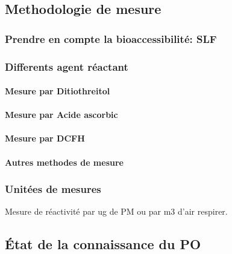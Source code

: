 \subsection{Methodologie de mesure}%
\label{sub:methodologie_de_mesure}

\subsubsection{Prendre en compte la bioaccessibilité: SLF}%
\label{sub:prendre_en_compte_la_bioaccessibilite_slf}

\subsubsection{Differents agent réactant}%
\label{ssub:differents_agent_reactant}

\paragraph{Mesure par Ditiothreitol}%
\label{ssub:mesure_par_ditiothreitol}

\paragraph{Mesure par Acide ascorbic}%
\label{ssub:mesure_par_acide_ascorbic}

\paragraph{Mesure par DCFH}%
\label{ssub:mesure_par_dcfh}

\paragraph{Autres methodes de mesure}%
\label{sub:autres_methodes_de_mesure}

\subsubsection{Unitées de mesures}%
\label{ssub:unitees_de_mesures}

Mesure de réactivité par ug de PM ou par m3 d'air respirer.

\subsection{État de la connaissance du PO}%
\label{sub:etat_de_la_connaissance_du_po}



\printbibliography[segment=2,heading=subbibliography]
